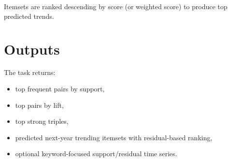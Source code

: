 \documentclass[11pt]{article}
\begin{document}
Itemsets are ranked descending by score (or weighted score) to produce top predicted trends.

\section{Outputs}
The task returns:
\begin{itemize}[leftmargin=1.5em]
  \item top frequent pairs by support,
  \item top pairs by lift,
  \item top strong triples,
  \item predicted next-year trending itemsets with residual-based ranking,
  \item optional keyword-focused support/residual time series.
\end{itemize}
\end{document}

